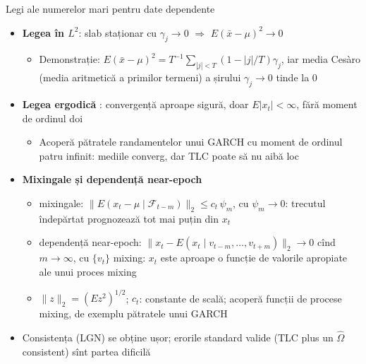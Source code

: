 \begin{frame}{Legi ale numerelor mari pentru date dependente}
\itemsize{\small}
\begin{itemize}
    \item \textbf{Legea în $L^2$}: slab staționar cu $\gamma_j \to 0$ $\Rightarrow$ $E(\bar x - \mu)^2 \to 0$
    \begin{itemize}
        \item Demonstrație: $E(\bar x - \mu)^2 = T^{-1}\sum_{|j|<T}(1 - |j|/T)\gamma_j$, iar media Cesàro (media aritmetică a primilor termeni) a șirului $\gamma_j \to 0$ tinde la 0
    \end{itemize}
    \item \textbf{Legea ergodică} : convergență aproape sigură, doar $E|x_t| < \infty$, fără moment de ordinul doi
    \begin{itemize}
        \item Acoperă pătratele randamentelor unui GARCH cu moment de ordinul patru infinit: mediile converg, dar TLC poate să nu aibă loc
    \end{itemize}
    \item \textbf{Mixingale și dependență near-epoch} 
    \begin{itemize}
        \item mixingale: $\|E(x_t - \mu \mid \mathcal{F}_{t-m})\|_2 \le c_t\,\psi_m$, cu $\psi_m \to 0$: trecutul îndepărtat prognozează tot mai puțin din $x_t$
        \item dependență near-epoch: $\|x_t - E(x_t \mid v_{t-m}, \dots, v_{t+m})\|_2 \to 0$ cînd $m \to \infty$, cu $\{v_t\}$ mixing: $x_t$ este aproape o funcție de valorile apropiate ale unui proces mixing
        \item $\|z\|_2 = (E z^2)^{1/2}$; $c_t$: constante de scală; acoperă funcții de procese mixing, de exemplu pătratele unui GARCH
    \end{itemize}
    \item Consistența (LGN) se obține ușor; erorile standard valide (TLC plus un $\hat\Omega$ consistent) sînt partea dificilă
\end{itemize}
\end{frame}

